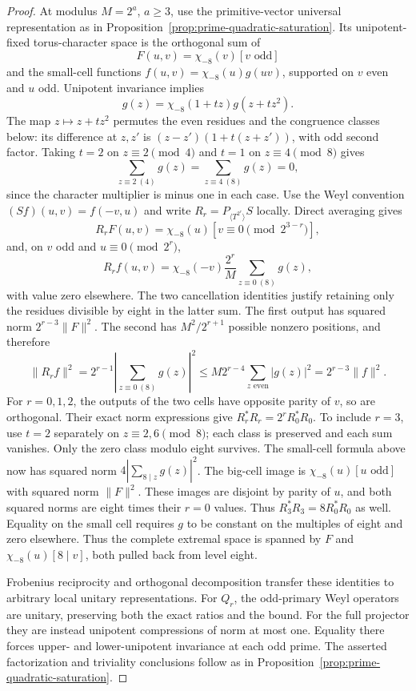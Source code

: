\begin{proof}
At modulus $M=2^a$, $a\geq3$, use the primitive-vector universal
representation as in Proposition~\ref{prop:prime-quadratic-saturation}.
Its unipotent-fixed torus-character space is the orthogonal sum of
\[
 F(u,v)=\chi_{-8}(v)[v\text{ odd}]
\]
and the small-cell functions
$f(u,v)=\chi_{-8}(u)g(uv)$, supported on $v$ even and $u$ odd.
Unipotent invariance implies
\[
 g(z)=\chi_{-8}(1+tz)g(z+tz^2).
\]
The map $z\mapsto z+tz^2$ permutes the even residues and the
congruence classes below: its difference at $z,z'$ is
$(z-z')(1+t(z+z'))$, with odd second factor.  Taking $t=2$ on
$z\equiv2\pmod4$ and $t=1$ on $z\equiv4\pmod8$ gives
\[
 \sum_{z\equiv2\ (4)}g(z)=
 \sum_{z\equiv4\ (8)}g(z)=0,
\]
since the character multiplier is minus one in each case.
Use the Weyl convention $(Sf)(u,v)=f(-v,u)$ and write
$R_r=P_{\langle T^{2^r}\rangle}S$ locally.  Direct averaging gives
\[
 R_rF(u,v)=\chi_{-8}(u)[v\equiv0\pmod{2^{3-r}}],
\]
and, on $v$ odd and $u\equiv0\pmod{2^r}$,
\[
 R_rf(u,v)=\chi_{-8}(-v)\frac{2^r}{M}
                 \sum_{z\equiv0\ (8)}g(z),
\]
with value zero elsewhere.  The two cancellation identities justify
retaining only the residues divisible by eight in the latter sum.
The first output has squared norm $2^{r-3}\|F\|^2$.  The second
has $M^2/2^{r+1}$ possible nonzero positions, and therefore
\[
 \|R_rf\|^2=2^{r-1}\left|\sum_{z\equiv0\ (8)}g(z)\right|^2
 \leq M2^{r-4}\sum_{z\text{ even}}|g(z)|^2
 =2^{r-3}\|f\|^2.
\]
For $r=0,1,2$, the outputs of the two cells have opposite parity of
$v$, so are orthogonal.  Their exact norm expressions give
$R_r^*R_r=2^rR_0^*R_0$.  To include $r=3$, use $t=2$ separately
on $z\equiv2,6\pmod8$; each class is preserved and each sum
vanishes.  Only the zero class modulo eight survives.  The small-cell
formula above now has squared norm $4|\sum_{8\mid z}g(z)|^2$.
The big-cell image is $\chi_{-8}(u)[u\text{ odd}]$ with squared
norm $\|F\|^2$.  These images are disjoint by parity of $u$,
and both squared norms are eight times their $r=0$ values.  Thus
$R_3^*R_3=8R_0^*R_0$ as well.
Equality on the small cell requires $g$ to be constant on the
multiples of eight and zero elsewhere.  Thus the complete extremal
space is spanned by $F$ and $\chi_{-8}(u)[8\mid v]$, both pulled
back from level eight.

Frobenius reciprocity and orthogonal decomposition transfer these
identities to arbitrary local unitary representations.  For $Q_r$,
the odd-primary Weyl operators are unitary, preserving both the exact
ratios and the bound.  For the full projector they are instead
unipotent compressions of norm at most one.  Equality there forces
upper- and lower-unipotent invariance at each odd prime.  The asserted
factorization and triviality conclusions follow as in
Proposition~\ref{prop:prime-quadratic-saturation}.
\end{proof}

